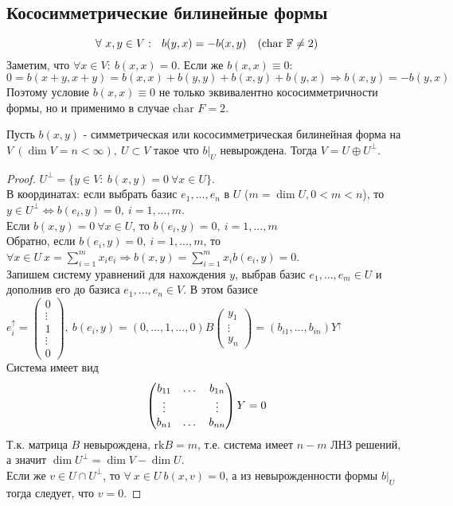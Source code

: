 \subsection{Кососимметрические билинейные формы}
$$\forall\ x,y \in V: \ \ b(y,x) = -b(x,y) \ \ \ (\text{char } \mathbb{F} \neq 2)$$
Заметим, что $\forall x\in V: \ b(x,x) = 0$. Если же $b(x, x) \equiv 0$:
$$0 = b(x+y,x+y) = b(x,x) + b(y,y) + b(x,y) + b(y,x) \Rightarrow b(x,y) = -b(y,x)$$
Поэтому условие $b(x,x) \equiv 0$ не только эквивалентно кососимметричности формы, но и применимо в случае $\text{char } F = 2$.
\begin{lemma}
    Пусть $b(x,y)$ - симметрическая или кососимметрическая билинейная форма на $V \ (\dim V = n < \infty), \ U\subset V$ такое что $b|_U$ невырождена. Тогда $V = U \oplus U^{\perp}$.
\end{lemma}
\begin{proof}
    $U^{\perp} = \{y\in V: \ b(x,y) = 0  \ \forall x\in U\}$.\\
    В координатах: если выбрать базис $e_1,...,e_n$ в $U$ ($m = \dim U, 0<m<n$), то $y \in U^{\perp} \Leftrightarrow b(e_i, y) = 0, \ i = 1,...,m$.\\
    Если $b(x,y) = 0 \ \forall x \in U$, то $b(e_i, y) = 0, \ i = 1,...,m$\\
    Обратно, если $b(e_i, y) = 0, \ i = 1,...,m$, то $\forall x \in U \ x = \sum \limits_{i=1}^m x_ie_i \Rightarrow b(x,y) = \sum \limits_{i=1}^m x_ib(e_i,y) = 0$.\\
    Запишем систему уравнений для нахождения $y$, выбрав базис $e_1,...,e_m \in U$ и дополнив его до базиса $e_1,...,e_n \in V$. В этом базисе $e_i^{\uparrow} = \begin{pmatrix} 0 \\ \vdots \\ 1 \\ \vdots \\ 0 \end{pmatrix}, \ b(e_i, y) = (0,...,1,...,0)B \begin{pmatrix} y_1 \\ \vdots \\ y_n \end{pmatrix} = (b_{i1},...,b_{in})Y^{\uparrow}$\\
    Система имеет вид 
    $$\begin{pmatrix}
        b_{11}&\dots&b_{1n}\\
        \vdots&\null&\vdots\\
        b_{n1}&\dots&b_{nn}
    \end{pmatrix} Y = 0$$
    Т.к. матрица $B$ невырождена, $\text{rk} B = m$, т.е. система имеет $n-m$ ЛНЗ решений, а значит $\dim U^\perp = \dim V - \dim U$.\\
    Если же $v \in U\cap U^\perp$, то $\forall \ x\in U \ b(x,v) = 0$, а из невырожденности формы $b|_U$ тогда следует, что $v = 0$. 
\end{proof}
